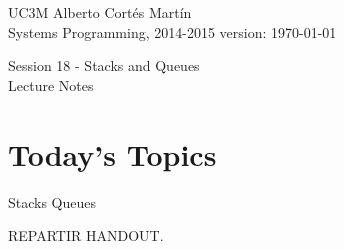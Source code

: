 \documentclass[a4paper, 9pt]{extarticle}
\newcommand{\realtitle}{Session 18 - Stacks and Queues}
\begin{document}
\makebox[\linewidth]{\rule{\textwidth}{0.4pt}}
UC3M \hfill Alberto Cortés Martín\\
Systems Programming, 2014-2015 \hfill version: \today\\
\makebox[\linewidth]{\rule{\textwidth}{0.4pt}}
\begin{center}
  \Large{\realtitle}\\Lecture Notes
\end{center}
\makebox[\linewidth]{\rule{\textwidth}{0.4pt}}
\vspace{1cm}


\section{Today's Topics}
\begin{blackboard}
Stacks
Queues
\end{blackboard}

REPARTIR HANDOUT.
\end{document}
